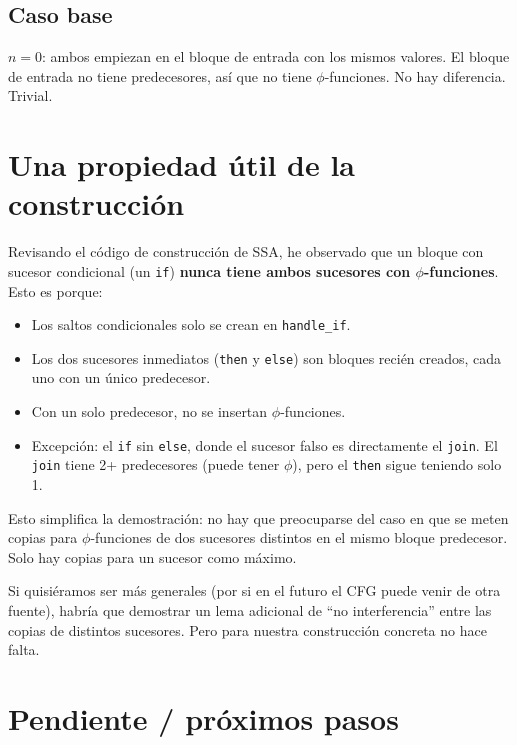 \documentclass[12pt, a4paper]{article}
\begin{document}
\subsection{Caso base}

$n = 0$: ambos empiezan en el bloque de entrada con los mismos valores. El bloque de entrada
no tiene predecesores, así que no tiene $\phi$-funciones. No hay diferencia. Trivial.

\section{Una propiedad útil de la construcción}

Revisando el código de construcción de SSA, he observado que un bloque con sucesor condicional
(un \texttt{if}) \textbf{nunca tiene ambos sucesores con $\phi$-funciones}. Esto es porque:

\begin{itemize}
  \item Los saltos condicionales solo se crean en \texttt{handle\_if}.
  \item Los dos sucesores inmediatos (\texttt{then} y \texttt{else}) son bloques recién creados,
    cada uno con un único predecesor.
  \item Con un solo predecesor, no se insertan $\phi$-funciones.
  \item Excepción: el \texttt{if} sin \texttt{else}, donde el sucesor falso es directamente
    el \texttt{join}. El \texttt{join} tiene 2+ predecesores (puede tener $\phi$), pero el
    \texttt{then} sigue teniendo solo 1.
\end{itemize}

Esto simplifica la demostración: no hay que preocuparse del caso en que se meten copias para
$\phi$-funciones de dos sucesores distintos en el mismo bloque predecesor. Solo hay copias
para un sucesor como máximo.

Si quisiéramos ser más generales (por si en el futuro el CFG puede venir de otra fuente),
habría que demostrar un lema adicional de ``no interferencia'' entre las copias de distintos
sucesores. Pero para nuestra construcción concreta no hace falta.

\section{Pendiente / próximos pasos}
\end{document}
